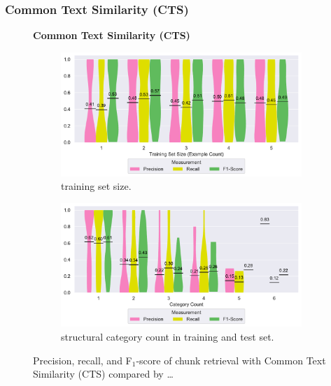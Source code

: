 \documentclass[10pt,journal,compsoc]{IEEEtran}
\begin{document}
\subsubsection{Common Text Similarity (CTS)}
\label{sec:r:cts}

\begin{figure}
\centering
    \textbf{Common Text Similarity (CTS)}\par\medskip
\begin{subfigure}[tb]{\columnwidth}
		\centering
		\includegraphics[width=\columnwidth,
		clip]{img/big-study/recall-precision-examplecount-CTS.pdf}
		\caption{training set size.}
		\label{fig:recall-precision-examplecount-CTS}

\end{subfigure}\hspace{\fill}
\begin{subfigure}[tb]{\columnwidth}
		\centering
				\includegraphics[width=\columnwidth,
				clip]{img/big-study/recall-precision-categorycount-CTS.pdf}
		\caption{structural category count
		in training and test set.}
		\label{fig:recall-precision-categorycount-CTS}
\end{subfigure}
\caption{Precision, recall, and F$_{1}$-score of chunk
retrieval with Common Text Similarity (CTS) compared by \ldots}
\label{fig:results-CTS}
\end{figure}
\end{document}
